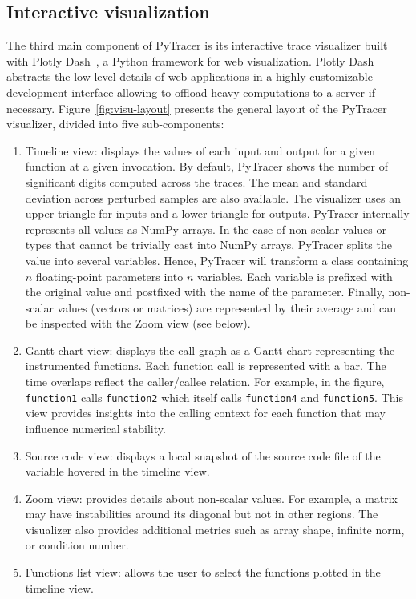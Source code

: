\documentclass[10pt,journal,compsoc]{IEEEtran}
\newcommand{\pytracer}[0]{PyTracer\xspace}
\begin{document}
\subsection{Interactive visualization}
The third main component of \pytracer is its interactive trace visualizer built
with Plotly Dash~\cite{plotly}, a Python framework for web visualization. Plotly
Dash abstracts the low-level details of web applications in a highly
customizable development interface allowing to offload heavy computations to a
server if necessary. Figure~\ref{fig:visu-layout} presents the general layout of
the \pytracer visualizer, divided into five sub-components:
\begin{enumerate}
    \item Timeline view: displays the values of each input and output
          for a given function at a given invocation. By default, \pytracer
          shows the number of significant digits computed across the traces. The
          mean and standard deviation across perturbed samples are also
          available. The visualizer uses an upper triangle for inputs and a
          lower triangle for outputs. \pytracer internally represents all values
          as NumPy arrays. In the case of non-scalar values or types that cannot
          be trivially cast into NumPy arrays, \pytracer splits the value into
          several variables. Hence, \pytracer will transform a class containing
          $n$ floating-point parameters into $n$ variables. Each variable is
          prefixed with the original value and postfixed with the name of the
          parameter. Finally, non-scalar values (vectors or matrices) are
          represented by their average and can be inspected with the Zoom view
          (see below).
    \item Gantt chart view: displays the call graph as a Gantt chart
          representing the instrumented functions. Each function call is
          represented with a bar. The time overlaps reflect the caller/callee
          relation. For example, in the figure, \texttt{function1} calls
          \texttt{function2} which itself calls \texttt{function4} and
          \texttt{function5}. This view provides insights into the calling context
          for each function that may influence numerical stability.
    \item  Source code view: displays a local snapshot of the source
          code file of the variable hovered in the timeline view.
    \item Zoom view: provides details about non-scalar values. For
          example, a matrix may have instabilities around its diagonal but not
          in other regions. The visualizer also provides additional metrics such
          as array shape, infinite norm, or condition number.
    \item  Functions list view: allows the user to select the
          functions plotted in the timeline view.
\end{enumerate}
\end{document}
